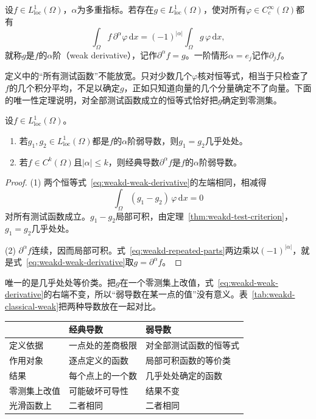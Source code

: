 \begin{definition}[弱导数]
\label{def:weakd-weak-derivative}
设$f\in L^1_{\mathrm{loc}}(\Omega)$，$\alpha$为多重指标。若存在$g\in L^1_{\mathrm{loc}}(\Omega)$，使对所有$\varphi\in C_c^\infty(\Omega)$都有
\begin{equation}
\int_\Omega f\,\partial^\alpha\varphi\,\mathrm dx=(-1)^{\lvert\alpha\rvert}\int_\Omega g\,\varphi\,\mathrm dx ,
\label{eq:weakd-weak-derivative}
\end{equation}
就称$g$是$f$的$\alpha$阶（weak derivative），记作$\partial^\alpha f=g$。一阶情形$\alpha=e_j$记作$\partial_jf$。
\end{definition}

定义中的“所有测试函数”不能放宽。只对少数几个$\varphi$核对恒等式，相当于只检查了$f$的几个积分平均，不足以确定$g$，正如只知道向量的几个分量确定不了向量。下面的唯一性定理说明，对全部测试函数成立的恒等式恰好把$g$确定到零测集。

\begin{theorem}[弱导数的唯一性与相容性]
\label{thm:weakd-uniqueness}
设$f\in L^1_{\mathrm{loc}}(\Omega)$。
\begin{enumerate}
\item 若$g_1,g_2\in L^1_{\mathrm{loc}}(\Omega)$都是$f$的$\alpha$阶弱导数，则$g_1=g_2$几乎处处。
\item 若$f\in C^k(\Omega)$且$\lvert\alpha\rvert\leq k$，则经典导数$\partial^\alpha f$是$f$的$\alpha$阶弱导数。
\end{enumerate}
\end{theorem}

\begin{proof}
(1) 两个恒等式~\eqref{eq:weakd-weak-derivative}的左端相同，相减得
\[
\int_\Omega(g_1-g_2)\,\varphi\,\mathrm dx=0
\]
对所有测试函数成立。$g_1-g_2$局部可积，由定理~\ref{thm:weakd-test-criterion}，$g_1=g_2$几乎处处。

(2) $\partial^\alpha f$连续，因而局部可积。式~\eqref{eq:weakd-repeated-parts}两边乘以$(-1)^{\lvert\alpha\rvert}$，就是式~\eqref{eq:weakd-weak-derivative}取$g=\partial^\alpha f$。
\end{proof}

唯一的是几乎处处等价类。把$g$在一个零测集上改值，式~\eqref{eq:weakd-weak-derivative}的右端不变，所以“弱导数在某一点的值”没有意义。表~\ref{tab:weakd-classical-weak}把两种导数放在一起对比。

\begin{BookInlineTable}
  \centering
  \begin{tabular}{@{}lll@{}}
    \toprule
    & 经典导数 & 弱导数\\
    \midrule
    定义依据 & 一点处的差商极限 & 对全部测试函数的恒等式\\
    作用对象 & 逐点定义的函数 & 局部可积函数的等价类\\
    结果 & 每个点上的一个数 & 几乎处处确定的函数\\
    零测集上改值 & 可能破坏可导性 & 结果不变\\
    光滑函数上 & 二者相同 & 二者相同\\
    \bottomrule
  \end{tabular}
  \caption{经典导数与弱导数的对比。}
  \label{tab:weakd-classical-weak}
\end{BookInlineTable}

